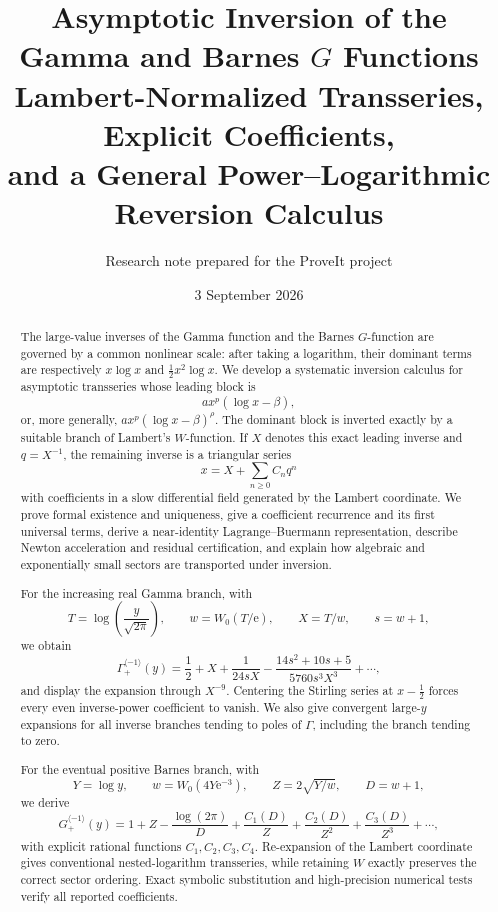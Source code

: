 \documentclass[11pt,a4paper]{article}
\title{\textbf{Asymptotic Inversion of the Gamma and Barnes \(G\) Functions}\\[0.35em]
\Large Lambert-Normalized Transseries, Explicit Coefficients,\\
and a General Power--Logarithmic Reversion Calculus}
\author{Research note prepared for the ProveIt project}
\date{3 September 2026}
\numberwithin{equation}{section}
\theoremstyle{definition}
\theoremstyle{remark}
\newcommand{\e}{\mathrm e}
\newcommand{\cinv}{\langle-1\rangle}
\newcommand{\GamInv}{\Gamma_{+}^{\cinv}}
\newcommand{\BarnesInv}{G_{+}^{\cinv}}
\begin{document}
\maketitle

\begin{abstract}
The large-value inverses of the Gamma function and the Barnes \(G\)-function
are governed by a common nonlinear scale: after taking a logarithm, their
dominant terms are respectively \(x\log x\) and \(\tfrac12x^2\log x\).
We develop a systematic inversion calculus for asymptotic transseries whose
leading block is
\[
  a x^p(\log x-\beta),
\]
or, more generally, \(a x^p(\log x-\beta)^\rho\).  The dominant block is
inverted exactly by a suitable branch of Lambert's \(W\)-function.  If
\(X\) denotes this exact leading inverse and \(q=X^{-1}\), the remaining
inverse is a triangular series
\[
  x=X+\sum_{n\geq0}C_n q^n
\]
with coefficients in a slow differential field generated by the Lambert
coordinate.  We prove formal existence and uniqueness, give a coefficient
recurrence and its first universal terms, derive a near-identity
Lagrange--Buer\-mann representation, describe Newton acceleration and
residual certification, and explain how algebraic and exponentially small
sectors are transported under inversion.

For the increasing real Gamma branch, with
\[
 T=\log\!\left(\frac{y}{\sqrt{2\pi}}\right),\qquad
 w=W_0(T/\e),\qquad X=T/w,\qquad s=w+1,
\]
we obtain
\[
 \GamInv(y)=\frac12+X+\frac{1}{24sX}
 -\frac{14s^2+10s+5}{5760s^3X^3}+\cdots,
\]
and display the expansion through \(X^{-9}\).  Centering the Stirling
series at \(x-\tfrac12\) forces every even inverse-power coefficient to
vanish.  We also give convergent large-\(y\) expansions for all inverse
branches tending to poles of \(\Gamma\), including the branch tending to
zero.

For the eventual positive Barnes branch, with
\[
 Y=\log y,\qquad w=W_0(4Y\e^{-3}),\qquad
 Z=2\sqrt{Y/w},\qquad D=w+1,
\]
we derive
\[
 \BarnesInv(y)=1+Z-\frac{\log(2\pi)}{D}
 +\frac{C_1(D)}{Z}+\frac{C_2(D)}{Z^2}
 +\frac{C_3(D)}{Z^3}+\cdots,
\]
with explicit rational functions \(C_1,C_2,C_3,C_4\).  Re-expansion of the
Lambert coordinate gives conventional nested-logarithm transseries, while
retaining \(W\) exactly preserves the correct sector ordering.  Exact
symbolic substitution and high-precision numerical tests verify all
reported coefficients.
\end{abstract}
\end{document}
